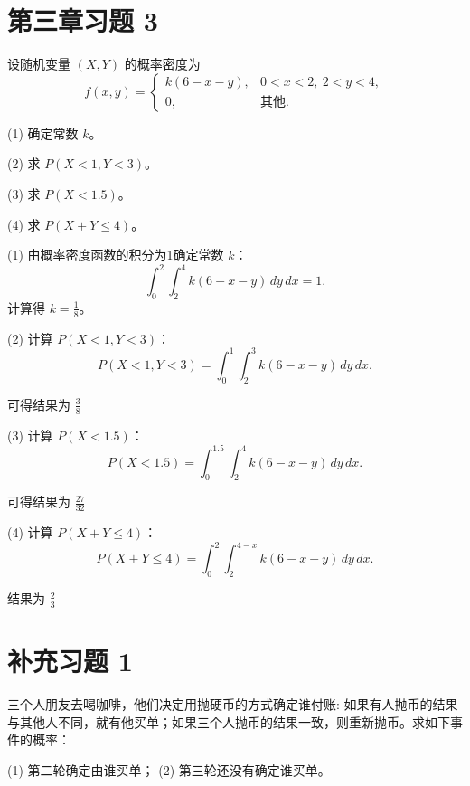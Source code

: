 \documentclass[twoside]{article}
\begin{document}
\section{第三章习题 3}

设随机变量 $(X, Y)$ 的概率密度为
\[
f(x, y) = 
\begin{cases} 
k(6 - x - y), & 0 < x < 2, \ 2 < y < 4, \\
0, & \text{其他}.
\end{cases}
\]

(1) 确定常数 $k$。

(2) 求 $P(X < 1, Y < 3)$。

(3) 求 $P(X < 1.5)$。

(4) 求 $P(X + Y \leq 4)$。

\begin{ans}{3}{3}

(1) 由概率密度函数的积分为1确定常数 $k$：
\[
\int_0^2 \int_2^4 k(6 - x - y) \, dy \, dx = 1.
\]
计算得 $k = \frac{1}{8}$。

(2) 计算 $P(X < 1, Y < 3)$：
\[
P(X < 1, Y < 3) = \int_0^1 \int_2^3 k(6 - x - y) \, dy \, dx.
\]

可得结果为 $ \frac{3}{8} $

(3) 计算 $P(X < 1.5)$：
\[
P(X < 1.5) = \int_0^{1.5} \int_2^4 k(6 - x - y) \, dy \, dx.
\]

可得结果为 $ \frac{27}{32} $

(4) 计算 $P(X + Y \leq 4)$：
\[
P(X + Y \leq 4) = \int_0^2 \int_2^{4 - x} k(6 - x - y) \, dy \, dx.
\]

结果为 $ \frac{2}{3} $

\end{ans}

\section{补充习题 1}

三个人朋友去喝咖啡，他们决定用抛硬币的方式确定谁付账: 如果有人抛币的结果与其他人不同，就有他买单；如果三个人抛币的结果一致，则重新抛币。求如下事件的概率：

(1) 第二轮确定由谁买单；  
(2) 第三轮还没有确定谁买单。
\end{document}
